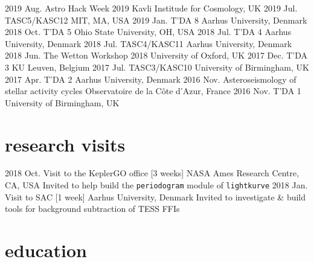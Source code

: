 \documentclass[]{k-cv} %
\begin{document}
\begin{entrylist}
\entrythree
{2019 Aug.}
{Astro Hack Week 2019}
{Kavli Institude for Cosmology, UK}
\entrythree
{2019 Jul.}
{TASC5/KASC12}
{MIT, MA, USA}
\entrythree
{2019 Jan.}
{T'DA 8}
{Aarhus University, Denmark}
\entrythree
{2018 Oct.}
{T'DA 5}
{Ohio State University, OH, USA}
\entrythree
{2018 Jul.}
{T'DA 4}
{Aarhus University, Denmark}
\entrythree
{2018 Jul.}
{TASC4/KASC11}
{Aarhus University, Denmark}
\entrythree
{2018 Jun.}
{The Wetton Workshop 2018}
{University of Oxford, UK}
\entrythree
{2017 Dec.}
{T'DA 3}
{KU Leuven, Belgium}
\entrythree
{2017 Jul.}
{TASC3/KASC10}
{University of Birmingham, UK}
\entrythree
{2017 Apr.}
{T'DA 2}
{Aarhus University, Denmark}
\entrythree
{2016 Nov.}
{Asteroseismology of stellar activity cycles}
{Observatoire de la C\^{o}te d'Azur, France}
\entrythree
{2016 Nov.}
{T'DA 1}
{University of Birmingham, UK}
\end{entrylist}


\section{research visits}
\begin{entrylist}
\entry
{2018 Oct.}
{Visit to the KeplerGO office [3 weeks]}
{NASA Ames Research Centre, CA, USA}
{Invited to help build the \texttt{periodogram} module of \texttt{lightkurve}}
\entry
{2018 Jan.}
{Visit to SAC [1 week]}
{Aarhus University, Denmark}
{Invited to investigate \& build tools for background subtraction of TESS FFIs}
\end{entrylist}

\clearpage
{}


\section{education}
\end{document}
